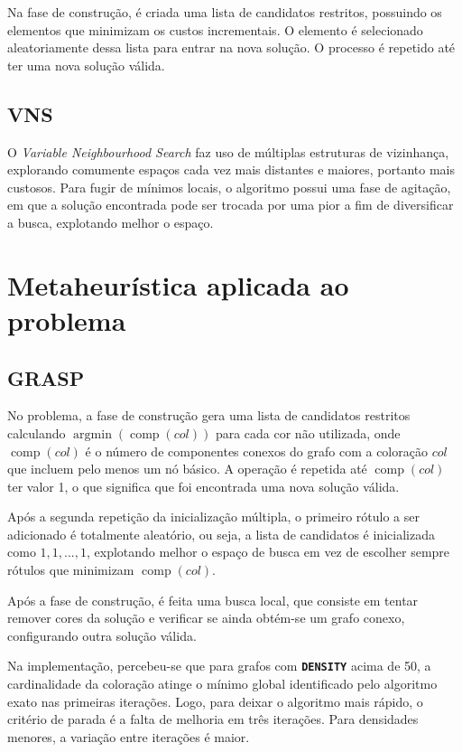 \documentclass[12pt, a4paper]{article}
\DeclareMathOperator{\argmin}{argmin}
\DeclareMathOperator{\comp}{comp}
\newcommand{\ic}[1]{\textbf{\lstinline{#1}}}
\begin{document}
Na fase de construção, é criada uma lista de candidatos restritos, possuindo os
elementos que minimizam os custos incrementais. O elemento é selecionado
aleatoriamente dessa lista para entrar na nova solução. O processo é repetido
até ter uma nova solução válida.

\subsection{VNS}
O \emph{Variable Neighbourhood Search} faz uso de múltiplas estruturas de
vizinhança, explorando comumente espaços cada vez mais distantes e maiores,
portanto mais custosos. Para fugir de mínimos locais, o algoritmo possui uma fase
de agitação, em que a solução encontrada pode ser trocada por uma pior a fim de
diversificar a busca, explotando melhor o espaço.

\section{Metaheurística aplicada ao problema}
\subsection{GRASP}
No problema, a fase de construção gera uma lista de candidatos restritos
calculando $ \argmin(\comp(col)) $ para cada cor não utilizada, onde $
\comp(col) $ é o número de componentes conexos do grafo com a coloração $ col $
que incluem pelo menos um nó básico. A operação é repetida até $ \comp(col) $
ter valor 1, o que significa que foi encontrada uma nova solução válida.

Após a segunda repetição da inicialização múltipla, o primeiro rótulo a ser
adicionado é totalmente aleatório, ou seja, a lista de candidatos é
inicializada como $ {1, 1, ..., 1 } $, explotando melhor o espaço de busca em
vez de escolher sempre rótulos que minimizam $ \comp(col) $.

Após a fase de construção, é feita uma busca local, que consiste em tentar
remover cores da solução e verificar se ainda obtém-se um grafo conexo,
configurando outra solução válida.

Na implementação, percebeu-se que para grafos com \ic{DENSITY} acima de 50, a
cardinalidade da coloração atinge o mínimo global identificado pelo algoritmo
exato nas primeiras iterações. Logo, para deixar o algoritmo mais rápido, o
critério de parada é a falta de melhoria em três iterações. Para densidades
menores, a variação entre iterações é maior.
\end{document}
